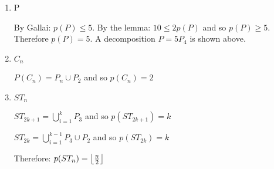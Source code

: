 \documentclass[letterpaper,12pt,fleqn]{article}
\DeclarePairedDelimiter{\floor}{\lfloor}{\rfloor}
\begin{document}
\begin{examples}
  \listbreak
  \begin{enumerate}
  \item P

    By Gallai: $p(P)\le5$. By the lemma: $10\le2p(P)$ and so $p(P)\ge5$.
    Therefore $p(P)=5$. A decomposition $P=5P_4$ is shown above.

  \item $C_n$

    $P(C_n)=P_n\cup P_2$ and so $p(C_n)=2$

  \item $ST_n$

    $ST_{2k+1}=\bigcup_{i=1}^kP_3$ and so $p(ST_{2k+1})=k$

    $ST_{2k}=\bigcup_{i=1}^{k-1}P_3\cup P_2$ and so $p(ST_{2k})=k$

    Therefore: $p(ST_n)=\floor*{\frac{n}{2}}$
  \end{enumerate}
\end{examples}
\end{document}
